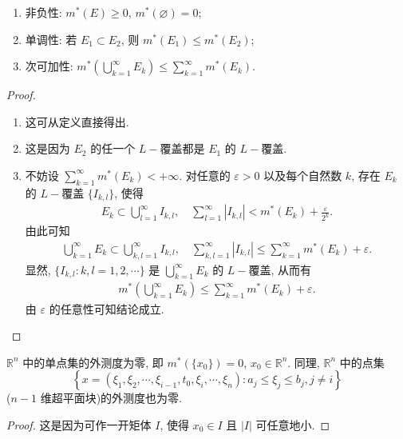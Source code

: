 \documentclass[../../main.tex]{subfiles}%
\begin{document}
\begin{theorem}\label{theorem:R^n 中点集的外测度性质}
\begin{enumerate}[(1)]
\item 非负性: \(m^*(E) \geqslant  0\), \(m^*(\varnothing)=0\);

\item 单调性: 若 \(E_1 \subset E_2\), 则 \(m^*(E_1) \leqslant  m^*(E_2)\);

\item 次可加性: \(m^*\left(\bigcup_{k = 1}^{\infty} E_k\right) \leqslant  \sum_{k = 1}^{\infty} m^*(E_k)\).
\end{enumerate}
\end{theorem}
\begin{proof}
\begin{enumerate}[(1)]
\item 这可从定义直接得出.

\item 这是因为 \(E_2\) 的任一个 \(L -\)覆盖都是 \(E_1\) 的 \(L -\)覆盖.

\item 不妨设 \(\sum_{k = 1}^{\infty} m^*(E_k) < + \infty\). 对任意的 \(\varepsilon > 0\) 以及每个自然数 \(k\), 存在 \(E_k\) 的 \(L -\)覆盖 \(\{I_{k, l}\}\), 使得
\begin{align*}
E_k \subset \bigcup_{l = 1}^{\infty} I_{k, l}, \quad \sum_{l = 1}^{\infty} |I_{k, l}| < m^*(E_k) + \frac{\varepsilon}{2^k}.
\end{align*}
由此可知
\begin{align*}
\bigcup_{k = 1}^{\infty} E_k \subset \bigcup_{k, l = 1}^{\infty} I_{k, l}, \quad \sum_{k, l = 1}^{\infty} |I_{k, l}| \leqslant  \sum_{k = 1}^{\infty} m^*(E_k) + \varepsilon.
\end{align*}
显然, \(\{I_{k, l} : k, l = 1, 2, \cdots\}\) 是 \(\bigcup_{k = 1}^{\infty} E_k\) 的 \(L -\)覆盖, 从而有
\begin{align*}
m^*\left(\bigcup_{k = 1}^{\infty} E_k\right) \leqslant  \sum_{k = 1}^{\infty} m^*(E_k) + \varepsilon.
\end{align*}
由 \(\varepsilon\) 的任意性可知结论成立.
\end{enumerate}

\end{proof}

\begin{proposition}\label{proposition-R^n中的单点集的外测度为零}
\(\mathbb{R}^n\) 中的单点集的外测度为零, 即 \(m^*(\{x_0\}) = 0\), \(x_0 \in \mathbb{R}^n\).  同理, \(\mathbb{R}^n\) 中的点集
\[
\left\{ x = (\xi_1, \xi_2, \cdots, \xi_{i - 1}, t_0, \xi_i, \cdots, \xi_n) : a_j \leqslant  \xi_j \leqslant  b_j, j \neq i \right\}
\]
(\(n - 1\) 维超平面块)的外测度也为零.
\end{proposition}
\begin{proof}

这是因为可作一开矩体 \(I\), 使得 \(x_0 \in I\) 且 \(|I|\) 可任意地小.

\end{proof}
\end{document}

